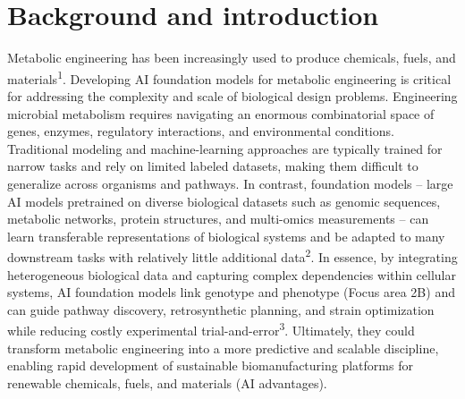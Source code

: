 
\section{Background and introduction}\label{sec:background}

Metabolic engineering has been increasingly used to produce chemicals, fuels, and
materials\textsuperscript{1}. Developing AI foundation models for metabolic
engineering is critical for addressing the complexity and scale of biological design
problems. Engineering microbial metabolism requires navigating an enormous
combinatorial space of genes, enzymes, regulatory interactions, and environmental
conditions. Traditional modeling and machine-learning approaches are typically
trained for narrow tasks and rely on limited labeled datasets, making them difficult
to generalize across organisms and pathways. In contrast, foundation models -- large
AI models pretrained on diverse biological datasets such as genomic sequences,
metabolic networks, protein structures, and multi-omics measurements -- can learn
transferable representations of biological systems and be adapted to many downstream
tasks with relatively little additional data\textsuperscript{2}. In essence, by
integrating heterogeneous biological data and capturing complex dependencies within
cellular systems, AI foundation models link genotype and phenotype (Focus area 2B)
and can guide pathway discovery, retrosynthetic planning, and strain optimization
while reducing costly experimental trial-and-error\textsuperscript{3}. Ultimately,
they could transform metabolic engineering into a more predictive and scalable
discipline, enabling rapid development of sustainable biomanufacturing platforms for
renewable chemicals, fuels, and materials (AI advantages).

